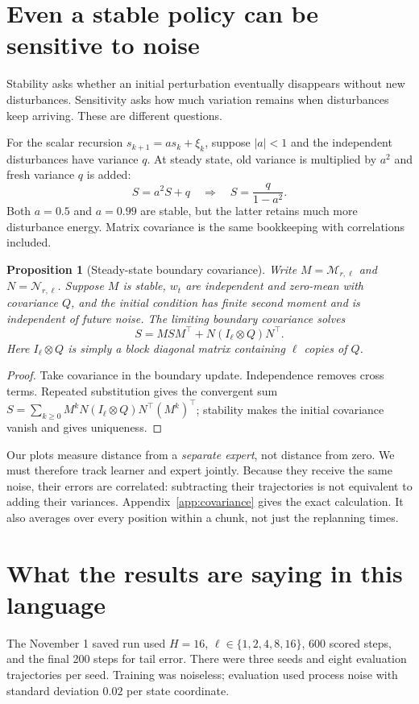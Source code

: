 \documentclass[12 pt]{article}        	%
\newtheorem{proposition}[theorem]{Proposition}
\theoremstyle{definition}
\begin{document}
\section{Even a stable policy can be sensitive to noise}
Stability asks whether an initial perturbation eventually disappears without new disturbances. Sensitivity asks how much variation remains when disturbances keep arriving. These are different questions.

For the scalar recursion $s_{k+1}=as_k+\xi_k$, suppose $|a|<1$ and the independent disturbances have variance $q$. At steady state, old variance is multiplied by $a^2$ and fresh variance $q$ is added:
\[
S=a^2S+q\quad\Longrightarrow\quad S=\frac{q}{1-a^2}.
\]
Both $a=0.5$ and $a=0.99$ are stable, but the latter retains much more disturbance energy. Matrix covariance is the same bookkeeping with correlations included.

\begin{proposition}[Steady-state boundary covariance]
Write $M=\mathcal M_{r,\ell}$ and $N=\mathcal N_{r,\ell}$. Suppose $M$ is stable, $w_t$ are independent and zero-mean with covariance $Q$, and the initial condition has finite second moment and is independent of future noise. The limiting boundary covariance solves
\[
S=MSM^\top+N(I_\ell\otimes Q)N^\top.
\]
Here $I_\ell\otimes Q$ is simply a block diagonal matrix containing $\ell$ copies of $Q$.
\end{proposition}
\begin{proof}
Take covariance in the boundary update. Independence removes cross terms. Repeated substitution gives the convergent sum
$S=\sum_{k\ge0}M^kN(I_\ell\otimes Q)N^\top(M^k)^\top$;
stability makes the initial covariance vanish and gives uniqueness.
\end{proof}

Our plots measure distance from a \emph{separate expert}, not distance from zero. We must therefore track learner and expert jointly. Because they receive the same noise, their errors are correlated: subtracting their trajectories is not equivalent to adding their variances. Appendix~\ref{app:covariance} gives the exact calculation. It also averages over every position within a chunk, not just the replanning times.

\section{What the results are saying in this language}
The November 1 saved run used $H=16$, $\ell\in\{1,2,4,8,16\}$, 600 scored steps, and the final 200 steps for tail error. There were three seeds and eight evaluation trajectories per seed. Training was noiseless; evaluation used process noise with standard deviation $0.02$ per state coordinate.
\end{document}
